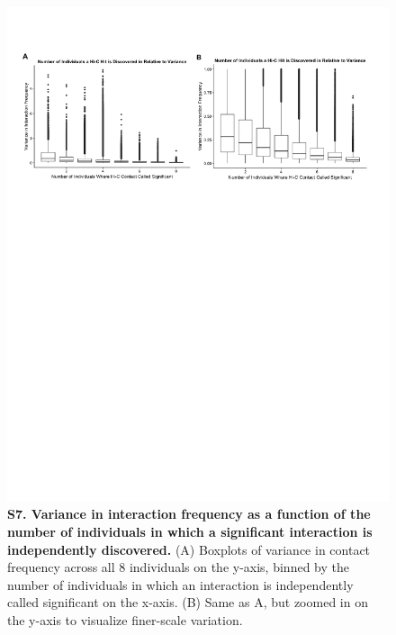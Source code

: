 \begin{figure}[!htb]
\centering
\includegraphics[width=6in]{img/figS7.pdf}
\caption[Variance in interaction frequency as a function of the number of individuals in which a significant interaction is independently discovered.]{\textbf{S7. Variance in interaction frequency as a function of the number of individuals in which a significant interaction is independently discovered.} (A) Boxplots of variance in contact frequency across all 8 individuals on the y-axis, binned by the number of individuals in which an interaction is independently called significant on the x-axis. (B) Same as A, but zoomed in on the y-axis to visualize finer-scale variation.}
\label{fig:figS7}
\end{figure}


